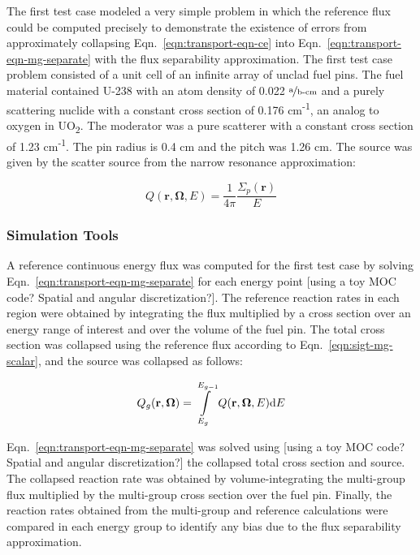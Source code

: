 The first test case modeled a very simple problem in which the reference flux could be computed precisely to demonstrate the existence of errors from approximately collapsing Eqn.~\ref{eqn:transport-eqn-ce} into Eqn.~\ref{eqn:transport-eqn-mg-separate} with the flux separability approximation. The first test case problem consisted of a unit cell of an infinite array of unclad fuel pins. The fuel material contained U-238 with an atom density of 0.022 $\nicefrac{\text{a}}{\text{b-cm}}$ and a purely scattering nuclide with a constant cross section of 0.176 cm\textsuperscript{-1}, an analog to oxygen in UO\textsubscript{2}. The moderator was a pure scatterer with a constant cross section of 1.23 cm\textsuperscript{-1}. The pin radius is 0.4 cm and the pitch was 1.26 cm. The source was given by the scatter source from the narrow resonance approximation:

\begin{dmath}
\label{eqn:test-source-ce}
Q(\mathbf{r},\mathbf{\Omega},E) = \frac{1}{4\pi} \frac{\Sigma_{p}(\mathbf{r})}{E}
\end{dmath}


\subsubsection{Simulation Tools}
\label{subsubsec:sim-tools-case1}

A reference continuous energy flux was computed for the first test case by solving Eqn.~\ref{eqn:transport-eqn-mg-separate} for each energy point {\color{red}[using a toy MOC code? Spatial and angular discretization?]}. The reference reaction rates in each region were obtained by integrating the flux multiplied by a cross section over an energy range of interest and over the volume of the fuel pin. The total cross section was collapsed using the reference flux according to Eqn.~\ref{eqn:sigt-mg-scalar}, and the source was collapsed as follows:

\begin{dmath}
\label{eqn:test1-source-mg}
Q_{g}(\mathbf{r},\mathbf{\Omega}) = \int\displaylimits_{E_{g}}^{E_{g-1}} Q(\mathbf{r},\mathbf{\Omega},E)\mathrm{d}E
\end{dmath}

Eqn.~\ref{eqn:transport-eqn-mg-separate} was solved using {\color{red}[using a toy MOC code? Spatial and angular discretization?]} the collapsed total cross section and source. The collapsed reaction rate was obtained by volume-integrating the multi-group flux multiplied by the multi-group cross section over the fuel pin. Finally, the reaction rates obtained from the multi-group and reference calculations were compared in each energy group to identify any bias due to the flux separability approximation.

